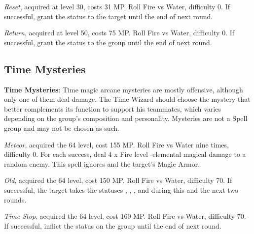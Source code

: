 \begin{multicols}{2}
    \textit{Reset}, acquired at level 30, costs 31 MP\@. Roll Fire vs Water, difficulty 0. If successful, grant the  status to the target until the end of next round.
    
    \textit{Return}, acquired at level 50, costs 75 MP\@. Roll Fire vs Water, difficulty 0. If successful, grant the  status to the group until the end of next round.
    
    \subsection{Time Mysteries}\label{subsec:time-mysteries}

    \textbf{Time Mysteries}: Time magic arcane mysteries are mostly offensive, although only one of them deal damage. The Time Wizard should choose the mystery that better complements its function to support his teammates, which varies depending on the group’s composition and personality. Mysteries are not a Spell group and may not be chosen as such.
    
    \textit{Meteor}, acquired the 64 level, cost 155 MP\@. Roll Fire vs Water nine times, difficulty 0. For each success, deal 4 x Fire level -elemental magical damage to a random enemy. This spell ignores  and the target’s Magic Armor.
    
    \textit{Old}, acquired the 64 level, cost 150 MP\@. Roll Fire vs Water, difficulty 70. If successful, the target takes the statuses , , ,  and  during this and the next two rounds.
    
    \textit{Time Stop}, acquired the 64 level, cost 160 MP\@. Roll Fire vs Water, difficulty 70. If successful, inflict the  status on the group until the end of next round.

\end{multicols}

